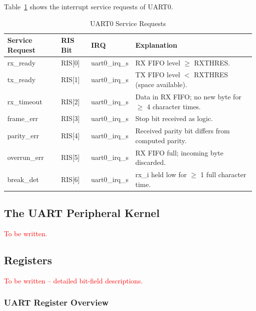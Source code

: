 Table~\ref{tab:asUartPer06b} shows the interrupt service requests of UART0.

\begin{table}[H]
\caption{UART0 Service Requests}
\label{tab:asUartPer06b}
\centering
\begin{tabularx}{\textwidth}{|l |l |l |X|}
  \hline
  Service Request & RIS Bit & IRQ & Explanation \\
  \hline
  \hline
  rx\_ready    & RIS[0] & uart0\_irq\_s & RX FIFO level $\geq$ RXTHRES. \\
  \hline
  tx\_ready    & RIS[1] & uart0\_irq\_s & TX FIFO level $<$ RXTHRES (space available). \\
  \hline
  rx\_timeout  & RIS[2] & uart0\_irq\_s & Data in RX FIFO; no new byte for $\geq$ 4 character times. \\
  \hline
  frame\_err   & RIS[3] & uart0\_irq\_s & Stop bit received as logic\;0. \\
  \hline
  parity\_err  & RIS[4] & uart0\_irq\_s & Received parity bit differs from computed parity. \\
  \hline
  overrun\_err & RIS[5] & uart0\_irq\_s & RX FIFO full; incoming byte discarded. \\
  \hline
  break\_det   & RIS[6] & uart0\_irq\_s & rx\_i held low for $\geq$ 1 full character time. \\
  \hline
\end{tabularx}
\end{table}

\subsection{The UART Peripheral Kernel}
\label{subsec:uartfunc02}
\textcolor{red}{To be written.}

\subsection{Registers}
\textcolor{red}{To be written -- detailed bit-field descriptions.}

\subsubsection{UART Register Overview}

